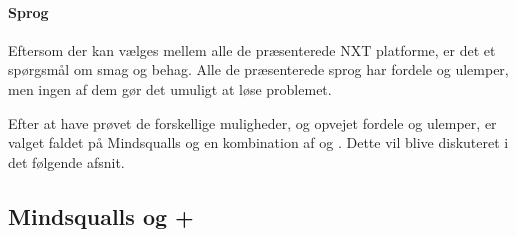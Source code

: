\paragraph{Sprog}
Eftersom der kan vælges mellem alle de præsenterede NXT platforme, er det et spørgsmål om smag og behag.
Alle de præsenterede sprog har fordele og ulemper, men ingen af dem gør det umuligt at løse problemet.

Efter at have prøvet de forskellige muligheder, og opvejet fordele og ulemper, er valget faldet på Mindsqualls og en kombination af \csharp og \fsharp.
Dette vil blive diskuteret i det følgende afsnit.

\subsection{Mindsqualls og \csharp + \fsharp}


